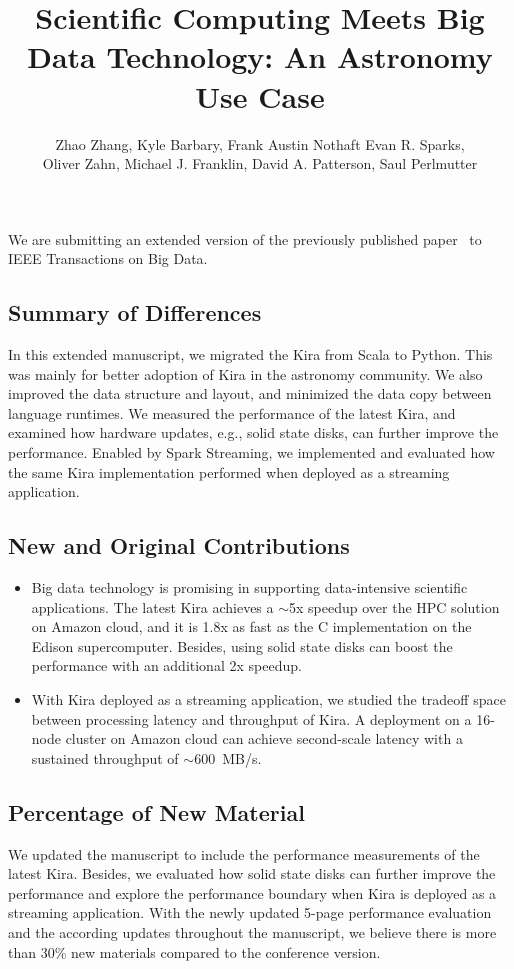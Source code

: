 \documentclass[10pt,a4paper]{article}
\title{Scientific Computing Meets Big Data Technology: An Astronomy Use Case}
\author{Zhao Zhang, Kyle Barbary, Frank Austin Nothaft Evan R. Sparks, \\Oliver Zahn, Michael J. Franklin, David A. Patterson, Saul Perlmutter}
\begin{document}
\maketitle
\noindent We are submitting an extended version of the previously published paper~\cite{lamport94} to IEEE Transactions on Big Data.
\subsection*{Summary of Differences}
In this extended manuscript, we migrated the Kira from Scala to Python. 
This was mainly for better adoption of Kira in the astronomy community. 
We also improved the data structure and layout, and minimized the data copy between language runtimes.
We measured the performance of the latest Kira, and examined how hardware updates, e.g., solid state disks, can further improve the performance.
Enabled by Spark Streaming, we implemented and evaluated how the same Kira implementation performed when deployed
as a streaming application. 

\subsection*{New and Original Contributions}
\begin{itemize}
\item{} Big data technology is promising in supporting data-intensive scientific applications.
The latest Kira achieves a $\sim$5x speedup over the HPC solution on Amazon cloud, 
and it is 1.8x as fast as the C implementation on the Edison supercomputer. 
Besides, using solid state disks can boost the performance with an additional 2x speedup.
\item{} With Kira deployed as a streaming application, we studied the tradeoff space between processing latency and throughput of Kira.
A deployment on a 16-node cluster on Amazon cloud can achieve second-scale latency with a sustained throughput of $\sim$600~MB/s.
\end{itemize}

\subsection*{Percentage of New Material}
We updated the manuscript to include the performance measurements of the latest Kira. 
Besides, we evaluated how solid state disks can further improve the performance and explore the performance boundary when Kira
is deployed as a streaming application.
With the newly updated 5-page performance evaluation and the according updates throughout the manuscript, we believe there is more
than 30\% new materials compared to the conference version.
\end{document}
